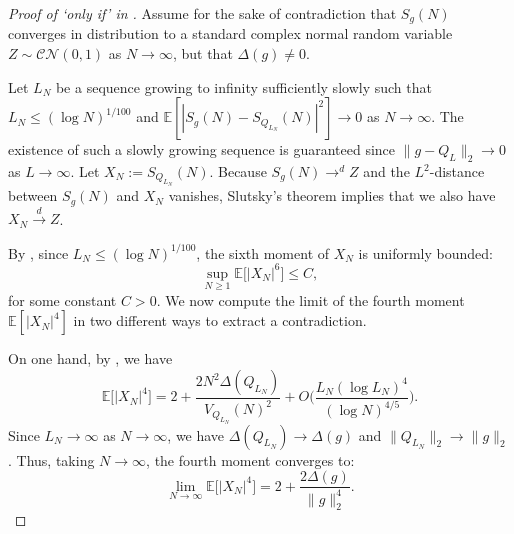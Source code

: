 \documentclass[12pt]{amsart}
\renewcommand{\le}{\leqslant}
\renewcommand{\geq}{\geqslant}
\numberwithin{equation}{section}
\theoremstyle{plain}
\theoremstyle{definition}
\newcommand{\E}{\mathbb{E}}
\newcommand{\CC}{\mathcal{C}}
\newcommand{\CN}{\mathcal{N}}
\begin{document}
	\begin{proof}[Proof of `only if' in ]
		Assume for the sake of contradiction that $S_{g}(N)$ converges in distribution to a standard complex normal random variable $Z \sim \CC\CN(0,1)$ as $N \to \infty$, but that $\Delta(g) \ne 0$. 
		
		Let $L_N$ be a sequence growing to infinity sufficiently slowly such that $L_N \le (\log N)^{1/100}$ and $\E[|S_g(N) - S_{Q_{L_N}}(N)|^2] \to 0$ as $N \to \infty$. The existence of such a slowly growing sequence is guaranteed since $\|g - Q_L\|_2 \to 0$ as $L \to \infty$. Let $X_N := S_{Q_{L_N}}(N)$. Because $S_g(N) \to^d Z$ and the $L^2$-distance between $S_g(N)$ and $X_N$ vanishes, Slutsky's theorem implies that we also have $X_N \xrightarrow{d} Z$.
		
		By , since $L_N \le (\log N)^{1/100}$, the sixth moment of $X_N$ is uniformly bounded:
		\begin{equation}\label{eq: bound 6}
			\sup_{N \geq 1} \E\big[|X_N|^6\big] \le C,
		\end{equation}
		for some constant $C > 0$. We now compute the limit of the fourth moment $\E[|X_N|^4]$ in two different ways to extract a contradiction.
		
		On one hand, by , we have
		\begin{equation*}
			\E\big[|X_N|^4\big] = 2 + \frac{2 N^2 \Delta(Q_{L_N})}{V_{Q_{L_N}}(N)^2} + O\bigg( \frac{ L_N(\log L_N)^4}{(\log N)^{4/5}} \bigg).
		\end{equation*}
		Since $L_N \to \infty$ as $N \to \infty$, we have $\Delta(Q_{L_N}) \to \Delta(g)$ and $\|Q_{L_N}\|_2 \to \|g\|_2$. Thus, taking $N \to \infty$, the fourth moment converges to:
		\begin{equation}\label{eq: limit 4th 1}
			\lim_{N \to \infty} \E\big[|X_N|^4\big] = 2 + \frac{2 \Delta(g)}{\|g\|_2^4}.
		\end{equation}
		

\end{proof}
\end{document}
